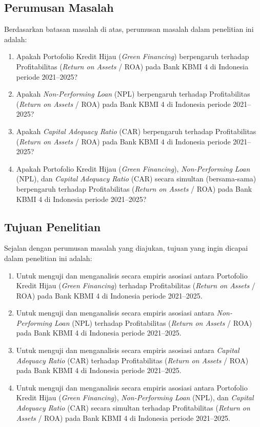 \documentclass[12pt,a4paper]{article}
\numberwithin{equation}{section}
\begin{document}
\subsection{Perumusan Masalah}

\noindent
Berdasarkan batasan masalah di atas, perumusan masalah dalam penelitian ini adalah:
\begin{enumerate}
  \item Apakah Portofolio Kredit Hijau (\emph{Green Financing}) berpengaruh terhadap Profitabilitas (\emph{Return on Assets} / ROA) pada Bank KBMI 4 di Indonesia periode 2021--2025?
  \item Apakah \emph{Non-Performing Loan} (NPL) berpengaruh terhadap Profitabilitas (\emph{Return on Assets} / ROA) pada Bank KBMI 4 di Indonesia periode 2021--2025?
  \item Apakah \emph{Capital Adequacy Ratio} (CAR) berpengaruh terhadap Profitabilitas (\emph{Return on Assets} / ROA) pada Bank KBMI 4 di Indonesia periode 2021--2025?
  \item Apakah Portofolio Kredit Hijau (\emph{Green Financing}), \emph{Non-Performing Loan} (NPL), dan \emph{Capital Adequacy Ratio} (CAR) secara simultan (bersama-sama) berpengaruh terhadap Profitabilitas (\emph{Return on Assets} / ROA) pada Bank KBMI 4 di Indonesia periode 2021--2025?
\end{enumerate}

\subsection{Tujuan Penelitian}

\noindent
Sejalan dengan perumusan masalah yang diajukan, tujuan yang ingin dicapai dalam penelitian ini adalah:
\begin{enumerate}
  \item Untuk menguji dan menganalisis secara empiris asosiasi antara Portofolio Kredit Hijau (\emph{Green Financing}) terhadap Profitabilitas (\emph{Return on Assets} / ROA) pada Bank KBMI 4 di Indonesia periode 2021--2025.
  \item Untuk menguji dan menganalisis secara empiris asosiasi antara \emph{Non-Performing Loan} (NPL) terhadap Profitabilitas (\emph{Return on Assets} / ROA) pada Bank KBMI 4 di Indonesia periode 2021--2025.
  \item Untuk menguji dan menganalisis secara empiris asosiasi antara \emph{Capital Adequacy Ratio} (CAR) terhadap Profitabilitas (\emph{Return on Assets} / ROA) pada Bank KBMI 4 di Indonesia periode 2021--2025.
  \item Untuk menguji dan menganalisis secara empiris asosiasi antara Portofolio Kredit Hijau (\emph{Green Financing}), \emph{Non-Performing Loan} (NPL), dan \emph{Capital Adequacy Ratio} (CAR) secara simultan terhadap Profitabilitas (\emph{Return on Assets} / ROA) pada Bank KBMI 4 di Indonesia periode 2021--2025.
\end{enumerate}
\end{document}

